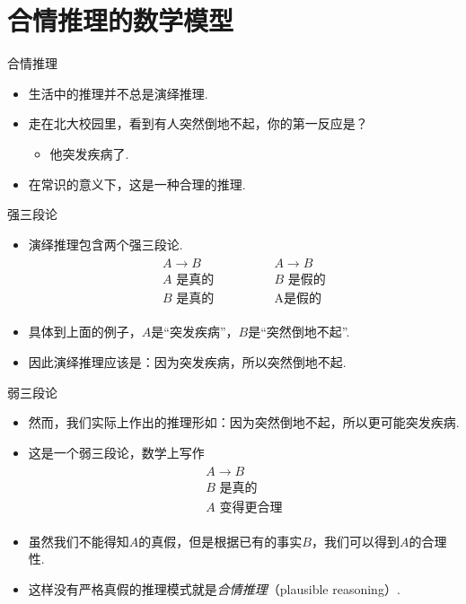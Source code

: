 \section{合情推理的数学模型}
\begin{frame}{合情推理}
\begin{itemize}
    \item 生活中的推理并不总是演绎推理.
    \item 走在北大校园里，看到有人突然倒地不起，你的第一反应是？
    \begin{itemize}
        \item 他突发疾病了.
    \end{itemize}
    \item 在常识的意义下，这是一种合理的推理.
\end{itemize}
\end{frame}

\begin{frame}{强三段论}
\begin{itemize}
    \item 演绎推理包含两个强三段论.
    \[
        \begin{array}{c}
            \begin{array}{c}  
                A \to B \\ A\text{ 是真的} \\ \hline B\text{ 是真的}
            \end{array} 
            \qquad \qquad 
            \begin{array}{c}  
                A \to B \\ B\text{ 是假的} \\ \hline \text{A是假的}
            \end{array}
        \end{array} 
    \]
    \item 具体到上面的例子，$A$是``突发疾病''，$B$是``突然倒地不起''.
    \item 因此演绎推理应该是：因为突发疾病，所以突然倒地不起.
\end{itemize}
\end{frame}

\begin{frame}{弱三段论}
\begin{itemize}
    \item 然而，我们实际上作出的推理形如：因为突然倒地不起，所以更可能突发疾病.
    \item 这是一个弱三段论，数学上写作 
        \[
        \begin{array}{c}
            \begin{array}{c}  
                A \to B \\ B\text{ 是真的} \\ \hline A\text{ 变得更合理}
            \end{array} 
        \end{array} 
    \]
    \item 虽然我们不能得知$A$的真假，但是根据已有的事实$B$，我们可以得到$A$的合理性.
    \item 这样没有严格真假的推理模式就是\emph{合情推理}（plausible reasoning）.
\end{itemize}
\end{frame}

